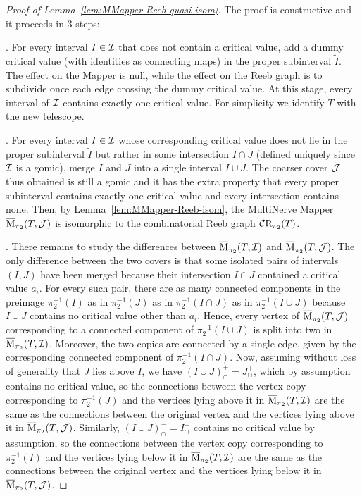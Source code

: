 \begin{proof}[Proof of Lemma~\ref{lem:MMapper-Reeb-quasi-isom}]
The proof is constructive and it proceeds in 3 steps:

. For every interval $I\in\mathcal{I}$ that does not contain a
critical value, add a dummy critical value (with identities as
connecting maps) in the proper subinterval $\tilde I$. The effect on the
Mapper is null, while the effect on the Reeb graph is to subdivide once
each edge crossing the dummy critical value. At this stage, every
interval of $\mathcal{I}$ contains exactly one critical value. For simplicity
we identify $T$ with the new telescope.

. For every interval $I\in\mathcal{I}$ whose corresponding critical
value does not lie in the proper subinterval $\tilde I$ but rather in some
intersection $I\cap J$ (defined uniquely since $\mathcal{I}$ is a gomic), merge
$I$ and $J$ into a single interval $I\cup J$. The coarser cover
$\mathcal{J}$ thus obtained is still a gomic and it has the extra property that
every proper subinterval contains exactly one critical
value and every intersection contains none. Then, by
Lemma~\ref{lem:MMapper-Reeb-isom}, the MultiNerve Mapper
$\overline{\mathrm{M}}_{\pi_2}(T,\mathcal{J})$ is isomorphic to the combinatorial Reeb graph
$\mathcal{C}\mathrm{R}_{\pi_2}(T)$.

. There remains to study the differences between
$\overline{\mathrm{M}}_{\pi_2}(T,\mathcal{I})$ and $\overline{\mathrm{M}}_{\pi_2}(T,\mathcal{J})$. The only
difference between the two covers is that some isolated pairs of
intervals $(I,J)$ have been merged because their intersection $I\cap
J$ contained a critical value $a_i$. For every such pair, there are as
many connected components in the preimage $\pi_2^{-1}(I)$ as in $\pi_2^{-1}(J)$ as in
$\pi_2^{-1}(I\cap J)$ as in $\pi_2^{-1}(I\cup J)$ because $I\cup J$ contains
no critical value other than $a_i$. Hence, every vertex of
$\overline{\mathrm{M}}_{\pi_2}(T,\mathcal{J})$ corresponding to a connected component of $\pi_2^{-1}(I\cup J)$
is split into two in $\overline{\mathrm{M}}_{\pi_2}(T,\mathcal{I})$. Moreover, the two
copies are connected by a single edge, given by the corresponding connected component
of $\pi_2^{-1}(I\cap J)$. Now, assuming without loss of generality that
$J$ lies above $I$, we have $(I\cup J)_\cap^+=J_\cap^+$, which by
assumption contains no critical value, so the connections between the
vertex copy corresponding to $\pi_2^{-1}(J)$ and the vertices lying above
it in $\overline{\mathrm{M}}_{\pi_2}(T,\mathcal{I})$ are the same as the connections between
the original vertex and the vertices lying above it in
$\overline{\mathrm{M}}_{\pi_2}(T,\mathcal{J})$. Similarly, $(I\cup J)_\cap^-=I_\cap^-$
contains no critical value by assumption, so the connections between
the vertex copy corresponding to $\pi_2^{-1}(I)$ and the vertices lying
below it in $\overline{\mathrm{M}}_{\pi_2}(T,\mathcal{I})$ are the same as the connections
between the original vertex and the vertices lying below it in
$\overline{\mathrm{M}}_{\pi_2}(T,\mathcal{J})$.
\end{proof}

